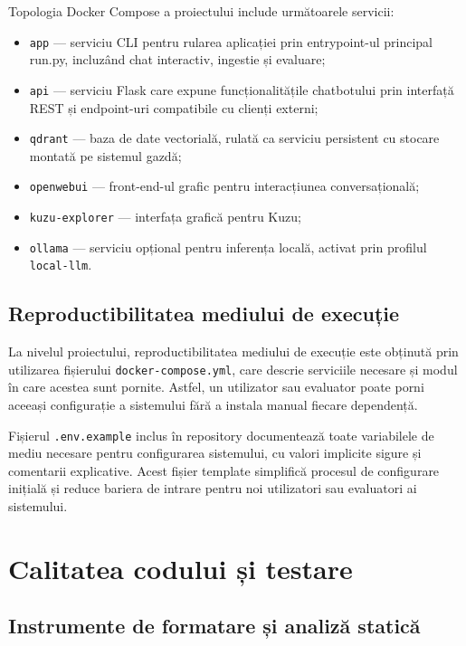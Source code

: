\documentclass[12pt, a4paper, oneside, romanian]{teza-upb}
\begin{document}
Topologia Docker Compose a proiectului include următoarele servicii:
\begin{itemize}
  \item \texttt{app} — serviciu CLI pentru rularea aplicației prin entrypoint-ul principal run.py,
  incluzând chat interactiv, ingestie și evaluare;
  \item \texttt{api} — serviciu Flask care expune funcționalitățile chatbotului prin interfață REST
  și endpoint-uri compatibile cu clienți externi;
  \item \texttt{qdrant} — baza de date vectorială, rulată ca serviciu 
  persistent cu stocare montată pe sistemul gazdă;
  \item \texttt{openwebui} — front-end-ul grafic pentru interacțiunea 
  conversațională;
  \item \texttt{kuzu-explorer} — interfața grafică pentru Kuzu;
  \item \texttt{ollama} — serviciu opțional pentru inferența locală, 
  activat prin profilul \texttt{local-llm}.
\end{itemize}

\subsection{Reproductibilitatea mediului de execuție}

La nivelul proiectului, reproductibilitatea mediului de execuție este obținută prin utilizarea fișierului \texttt{docker-compose.yml}, care descrie serviciile necesare și modul în care acestea sunt pornite. Astfel, un utilizator sau evaluator poate porni aceeași configurație a sistemului fără a instala manual fiecare dependență.

Fișierul \texttt{.env.example} inclus în repository documentează  toate variabilele de mediu necesare pentru configurarea sistemului, cu valori implicite sigure și comentarii explicative. Acest fișier template simplifică procesul de configurare inițială și reduce bariera de intrare pentru noi utilizatori sau evaluatori ai sistemului.

\section{Calitatea codului și testare}

\subsection{Instrumente de formatare și analiză statică}
\end{document}
